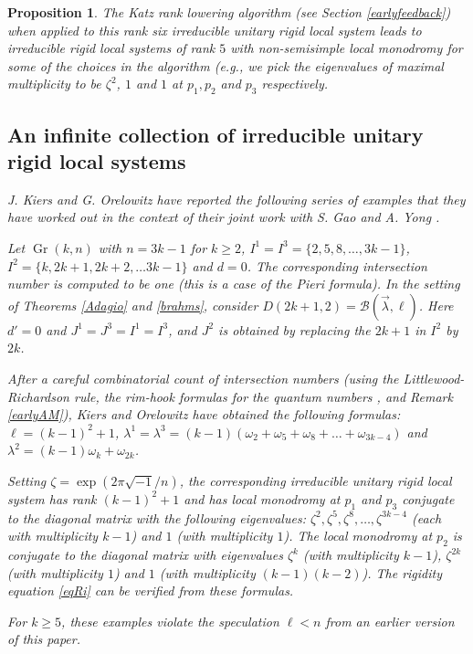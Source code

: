 \documentclass[11pt]{amsart}
\newcommand\Gr{\operatorname{Gr}}
\newtheorem{proposition}[theorem]{Proposition}
\numberwithin{theorem}{subsection}
\begin{document}
{\begin{proposition}
The Katz rank lowering algorithm (see Section \ref{earlyfeedback}) when applied to this rank six irreducible unitary rigid local system leads to irreducible rigid local systems of rank $5$ with non-semisimple local monodromy for some  of the choices in the algorithm (e.g., we pick the eigenvalues of maximal multiplicity to be $\zeta^2$, $1$ and $1$ at $p_1,p_2$ and $p_3$ respectively.

\subsection{An infinite collection of irreducible  unitary rigid local systems}\label{KO}
J. Kiers and G. Orelowitz have reported the following series of examples that they have worked out in the context of  their joint work with S. Gao and A. Yong \cite{Kiers_etal}.

Let  $\Gr(k,n)$ with $n=3k-1$ for $k\ge2$, $I^1=I^3=\{2,5,8,\dots,3k-1\}$, $I^2=\{k,2k+1,2k+2,\dots 3k-1\}$ and $d=0$. The corresponding intersection number is computed to be one (this is a case of the Pieri formula).  In the setting of Theorems \ref{Adagio} and \ref{brahms}, consider $D(2k+1,2)=\mathcal{B}(\vec{\lambda},\ell)$. Here $d'=0$ and $J^1=J^3=I^1=I^3$, and $J^2$ is obtained by replacing the $2k+1$ in $I^2$ by $2k$.

After a careful combinatorial count of  intersection numbers (using the Littlewood-Richardson rule, the rim-hook formulas for the quantum numbers \cite{BCFF}, and Remark \ref{earlyAM}), Kiers and Orelowitz have obtained the following formulas: $\ell=(k-1)^2+1$,
$\lambda^1=\lambda^3= (k-1)(\omega_2 +\omega_5 + \omega_8+ \dots +\omega_{3k-4})$ and $\lambda^2=(k-1)\omega_{k} +\omega_{2k}$.

Setting $\zeta=\exp(2\pi\sqrt{-1}/n)$, the corresponding irreducible unitary rigid local system has rank $(k-1)^2+1$ and has local monodromy at $p_1$ and $p_3$ conjugate to the diagonal matrix with the following eigenvalues: $\zeta^2,\zeta^5,\zeta^8,\dots, \zeta^{3k-4}$ (each with multiplicity $k-1$) and $1$ (with multiplicity $1$). The local monodromy at $p_2$ is conjugate to the diagonal matrix with eigenvalues $\zeta^k$ (with multiplicity $k-1$), $\zeta^{2k}$ (with multiplicity $1$) and $1$ (with multiplicity $(k-1)(k-2)$).  The rigidity equation  \eqref{eqRi}  can be verified from these formulas.

For $k\ge 5$, these examples violate the speculation $\ell<n$ from an earlier version of this paper.






\end{proposition}}
\end{document}
